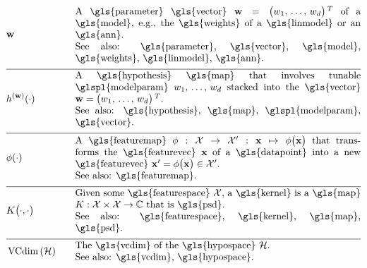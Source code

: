 \begin{align} 
	&\weights  &\quad & \parbox{.85\textwidth}{A \gls{parameter} \gls{vector} $\weights = \big(\weight_{1}, \,\ldots, \,\weight_{\featuredim}\big)\,^{T}$ 
		of a \gls{model}, e.g., the \gls{weights} of a \gls{linmodel} or an \gls{ann}.
		\\ See also: \gls{parameter}, \gls{vector}, \gls{model}, \gls{weights}, \gls{linmodel}, \gls{ann}. }     \nonumber \\[2mm] \hline \nonumber\\[-5mm]
	&\hypothesis^{(\weights)}(\cdot)  &\quad &\parbox{.85\textwidth}{A \gls{hypothesis} \gls{map} that involves tunable \glspl{modelparam} 
		$\weight_{1}, \,\ldots, \,\weight_{\featuredim}$ stacked into the \gls{vector} $\weights=\big(\weight_{1}, \,\ldots, \,\weight_{\featuredim} \big)\,^{T}$.
		\\ See also: \gls{hypothesis}, \gls{map}, \glspl{modelparam}, \gls{vector}. } \nonumber \\[2mm] \hline \nonumber\\[-5mm]
	&\featuremap(\cdot)  &\quad & \parbox{.85\textwidth}{A \gls{featuremap} 
		$\featuremap: \featurespace \rightarrow \featurespace' : \featurevec \mapsto \featuremap\big( \featurevec \big)$ that 
		transforms the \gls{featurevec} $\featurevec$ of a \gls{datapoint} into a new \gls{featurevec} $\featurevec'= \featuremap\big( \featurevec \big) \in \featurespace'$.
		\\ See also: \gls{featuremap}. }   \nonumber \\[2mm] \hline \nonumber\\[-5mm]
	&\kernelmap{\cdot}{\cdot} &\quad & \parbox{.85\textwidth}{Given some \gls{featurespace} $\featurespace$, 
		a \gls{kernel} is a \gls{map} $\kernel: \featurespace \times \featurespace \rightarrow \mathbb{C}$ that is \gls{psd}.
		\\ See also: \gls{featurespace}, \gls{kernel}, \gls{map}, \gls{psd}. }    \nonumber \\[2mm] \hline \nonumber\\[-5mm]  
	&\vcdim{\hypospace} &\quad & \parbox{.85\textwidth}{The \gls{vcdim} of the \gls{hypospace} $\hypospace$. 
		\\ See also: \gls{vcdim}, \gls{hypospace}. }    \nonumber                                                                                                                                               
\end{align}              







